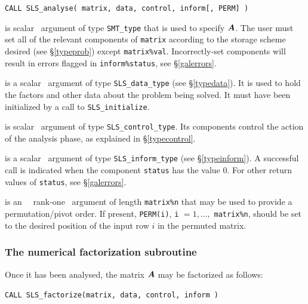 \documentclass{galahad}
\newcommand{\packagename}{SLS}
\begin{document}
\hskip0.5in
{\tt CALL \packagename\_analyse( matrix, data, control, inform[, PERM] )}

\begin{description}
 is scalar \intentin\ argument of type {\tt SMT\_type}
that is used to specify ${\bm{A}}$.
The user must set all of the relevant components of {\tt matrix} according
to the storage scheme desired (see \S\ref{typeprob}) except
{\tt matrix\%val}. Incorrectly-set components will result in errors
flagged in {\tt inform\%status}, see \S\ref{galerrors}.

 is a scalar \intentinout\ argument of type
{\tt \packagename\_data\_type}
(see \S\ref{typedata}). It is used to hold the factors and other
data about the problem being solved.
It must have been initialized by a call to
{\tt \packagename\_ini\-tialize}.

 is scalar \intentin\ argument of type
{\tt \packagename\_control\_type}. Its components control the action
of the analysis phase, as explained in
\S\ref{typecontrol}.

 is a scalar \intentinout\ argument of type
{\tt \packagename\_inform\_type}
(see \S\ref{typeinform}).
A successful call is indicated when the  component {\tt status} has the value 0.
For other return values of {\tt status}, see \S\ref{galerrors}.

 is an \optional\ \intentin\ rank-one \integer\ argument of
length {\tt matrix\%n} that may be used to provide a permutation/pivot
order.
If present, {\tt PERM(i)}, {\tt i} $= 1, \ldots,$ {\tt matrix\%n}, should be set
to the desired position of the input row $i$ in the permuted matrix.

\end{description}


\subsubsection{The numerical factorization subroutine}
Once it has been analysed, the matrix ${\bm{A}}$ may be factorized as follows:

\hskip0.5in
{\tt CALL \packagename\_factorize(matrix, data, control, inform )}
\end{document}

